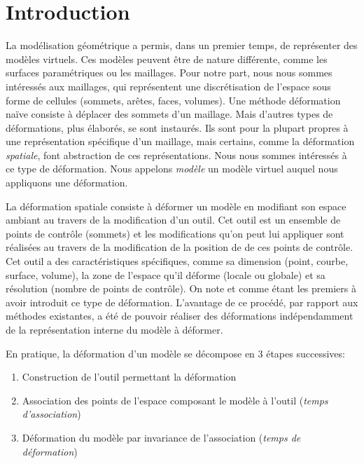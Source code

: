 
\chapter{Introduction}

\graphicspath{ {Introduction/IntroductionFigs/PNG/}
  {Introduction/IntroductionFigs/PDF/}
  {Introduction/IntroductionFigs/} }

La modélisation géométrique a permis, dans un premier temps, de représenter
des modèles virtuels. Ces modèles peuvent être de nature différente, comme les
surfaces paramétriques ou les maillages. Pour notre part, nous nous sommes
intéressés aux maillages, qui représentent une discrétisation de l'espace sous
forme de cellules (sommets, arêtes, faces, volumes). Une méthode déformation
naïve consiste à déplacer des sommets d'un maillage. Mais d'autres types de
déformations, plus élaborés, se sont instaurés. Ils sont pour la plupart
propres à une représentation spécifique d'un maillage, mais certains, comme la
déformation \textit{spatiale}, font abstraction de ces représentations. Nous
nous sommes intéressés à ce type de déformation. Nous appelons \textit{modèle}
un modèle virtuel auquel nous appliquons une déformation.
	
La déformation spatiale consiste à déformer un modèle en modifiant son espace
ambiant au travers de la modification d'un outil. Cet outil est un ensemble de
points de contrôle (sommets) et les modifications qu'on peut lui appliquer
sont réalisées au travers de la modification de la position de de ces points
de contrôle. Cet outil a des caractéristiques spécifiques, comme sa dimension
(point, courbe, surface, volume), la zone de l'espace qu'il déforme (locale ou
globale) et sa résolution (nombre de points de contrôle). On note \cite{Bar84}
et \cite{SP86} comme étant les premiers à avoir introduit ce type de
déformation. L'avantage de ce procédé, par rapport aux méthodes existantes, a
été de pouvoir réaliser des déformations indépendamment de la représentation
interne du modèle à déformer.

\newpage

En pratique, la déformation d'un modèle se décompose en 3 étapes successives:
\begin{enumerate}

\item Construction de l'outil permettant la déformation

\item Association des points de l'espace composant le modèle à l'outil
(\textit{temps d'association})

\item Déformation du modèle par invariance de l'association (\textit{temps de
déformation})

\end{enumerate} 

